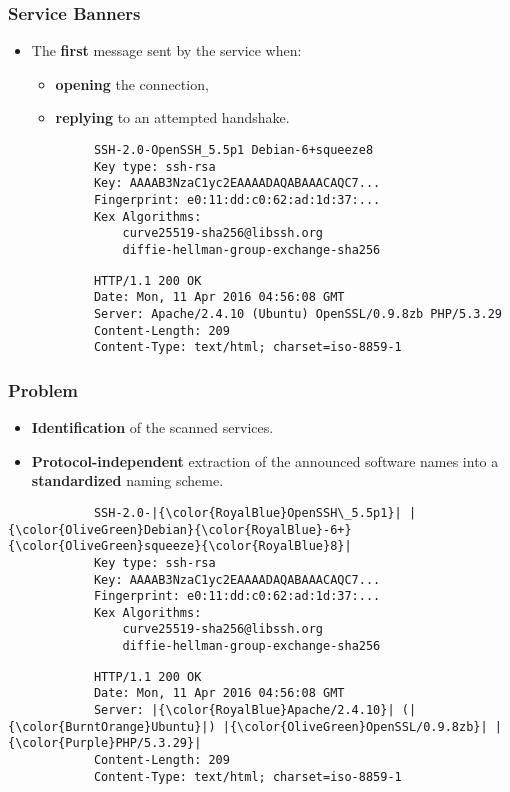 \documentclass[aspectratio=169,xcolor={usenames,dvipsnames}]{beamer}
\newcommand{\ispace}{\vspace{10pt}}
\begin{document}
\begin{frame}[fragile]
	\frametitle{Service Banners}
	
	\begin{itemize}
		\item The \textbf{first} message sent by the service when:
		\begin{itemize}
			\item \textbf{opening} the connection,
			\item \textbf{replying} to an attempted handshake.
		\end{itemize}
	\end{itemize}
	
	\vspace{16pt}
	
	\begin{multicols}{2}
		\begin{verbatim}
			SSH-2.0-OpenSSH_5.5p1 Debian-6+squeeze8
			Key type: ssh-rsa
			Key: AAAAB3NzaC1yc2EAAAADAQABAAACAQC7...
			Fingerprint: e0:11:dd:c0:62:ad:1d:37:...
			Kex Algorithms:
				curve25519-sha256@libssh.org
				diffie-hellman-group-exchange-sha256
		\end{verbatim}
		\begin{verbatim}
			HTTP/1.1 200 OK
			Date: Mon, 11 Apr 2016 04:56:08 GMT
			Server: Apache/2.4.10 (Ubuntu) OpenSSL/0.9.8zb PHP/5.3.29
			Content-Length: 209
			Content-Type: text/html; charset=iso-8859-1 
		\end{verbatim}
	\end{multicols}
\end{frame}

\begin{frame}[fragile]
	\frametitle{Problem}
	
	\begin{itemize}
		\item \textbf{Identification} of the scanned services.
		\item \textbf{Protocol-independent} extraction of the announced software names into a \textbf{standardized} naming scheme.
	\end{itemize}
	
	\ispace
	
	\begin{multicols}{2}
		\begin{verbatim}
			SSH-2.0-|{\color{RoyalBlue}OpenSSH\_5.5p1}| |{\color{OliveGreen}Debian}{\color{RoyalBlue}-6+}{\color{OliveGreen}squeeze}{\color{RoyalBlue}8}|
			Key type: ssh-rsa
			Key: AAAAB3NzaC1yc2EAAAADAQABAAACAQC7...
			Fingerprint: e0:11:dd:c0:62:ad:1d:37:...
			Kex Algorithms:
				curve25519-sha256@libssh.org
				diffie-hellman-group-exchange-sha256
		\end{verbatim}
		\begin{verbatim}
			HTTP/1.1 200 OK
			Date: Mon, 11 Apr 2016 04:56:08 GMT
			Server: |{\color{RoyalBlue}Apache/2.4.10}| (|{\color{BurntOrange}Ubuntu}|) |{\color{OliveGreen}OpenSSL/0.9.8zb}| |{\color{Purple}PHP/5.3.29}|
			Content-Length: 209
			Content-Type: text/html; charset=iso-8859-1 
		\end{verbatim}
	\end{multicols}
\end{frame}
\end{document}

